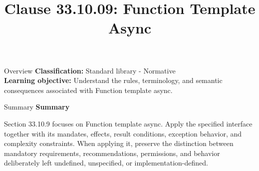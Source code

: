 \documentclass[10pt,letterpaper]{article}
\title{Clause 33.10.09: Function Template Async}
\author{}
\date{}
\begin{document}
\maketitle
\begin{CornellOverviewBox}{Overview}
\textbf{Classification:} Standard library - Normative\\[2pt]
\textbf{Learning objective:} Understand the rules, terminology, and semantic consequences associated with Function template async.
\end{CornellOverviewBox}\begin{CornellSummaryBox}{Summary}
{\sffamily\bfseries\color{Accent} Summary}\par\vspace{3pt}Section 33.10.9 focuses on Function template async. Apply the specified interface together with its mandates, effects, result conditions, exception behavior, and complexity constraints. When applying it, preserve the distinction between mandatory requirements, recommendations, permissions, and behavior deliberately left undefined, unspecified, or implementation-defined.
\end{CornellSummaryBox}
\end{document}

